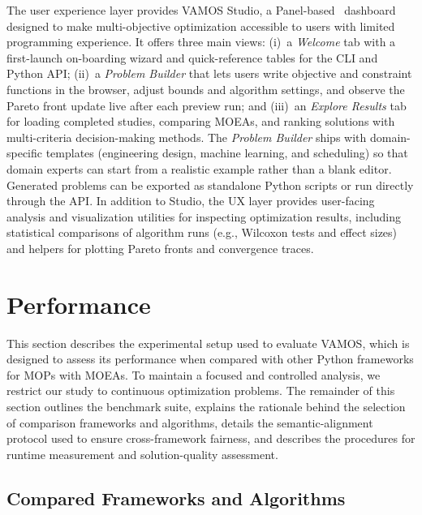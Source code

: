 \documentclass[final,5p,times,twocolumn]{elsarticle}
\newcommand{\VAMOS}{VAMOS}
\begin{document}
The user experience layer provides \VAMOS{} Studio, a Panel-based~\cite{panel24} dashboard designed to make multi-objective optimization accessible to users with limited programming experience. It offers three main views: (i)~a \textit{Welcome} tab with a first-launch on-boarding wizard and quick-reference tables for the CLI and Python API; (ii)~a \textit{Problem Builder} that lets users write objective and constraint functions in the browser, adjust bounds and algorithm settings, and observe the Pareto front update live after each preview run; and (iii)~an \textit{Explore Results} tab for loading completed studies, comparing MOEAs, and ranking solutions with multi-criteria decision-making methods. The \textit{Problem Builder} ships with domain-specific templates (engineering design, machine learning, and scheduling) so that domain experts can start from a realistic example rather than a blank editor. Generated problems can be exported as standalone Python scripts or run directly through the API. In addition to Studio, the UX layer provides user-facing analysis and visualization utilities for inspecting optimization results, including statistical comparisons of algorithm runs (e.g., Wilcoxon tests and effect sizes) and helpers for plotting Pareto fronts and convergence traces.



\section{Performance}
\label{sec:performance}

This section describes the experimental setup used to evaluate \VAMOS{}, which is designed to assess its performance when compared with other Python frameworks for MOPs with MOEAs. To maintain a focused and controlled analysis, we restrict our study to continuous optimization problems. The remainder of this section outlines the benchmark suite, explains the rationale behind the selection of comparison frameworks and algorithms, details the semantic-alignment protocol used to ensure cross-framework fairness, and describes the procedures for runtime measurement and solution-quality assessment.

\subsection{Compared Frameworks and Algorithms}
\end{document}
